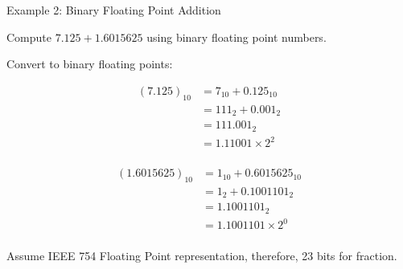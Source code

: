 \begin{frame}{Example 2: Binary Floating Point Addition}
\begin{tcolorbox}[enhanced,attach boxed title to top center={yshift=-3mm,yshifttext=-1mm},
colback=red!5!white,colframe=red!75!black,colbacktitle=red!80!black,
title=Try this,fonttitle=\bfseries,
boxed title style={size=small,colframe=red!50!black} ]
Compute $7.125+ 1.6015625$ using binary floating point numbers. 
\end{tcolorbox}
Convert to binary floating points: 
  \begin{multicols}{2}
\begin{align*}
(7.125)_{10}&= 7_{10} + 0.125_{10}\\
&= 111_2 + 0.001_2\\
&= 111.001_2 \\
&= 1.11001 \times 2^2\\
\end{align*}

\columnbreak

\begin{align*}
(1.6015625)_{10}&= 1_{10} + 0.6015625_{10}\\
&= 1_2 + 0.1001101_2\\
&= 1.1001101_2 \\
&= 1.1001101 \times 2^0\\
\end{align*}
\end{multicols}
Assume IEEE 754 Floating Point representation, therefore, 23 bits for fraction.  
\end{frame}

